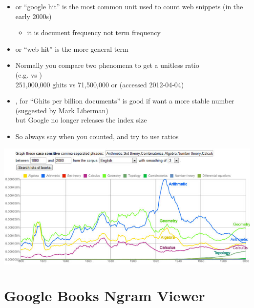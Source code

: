 \documentclass[a4paper,landscape,headrule,footrule,xetex]{foils}
\begin{document}
\begin{itemize}\addtolength{\itemsep}{-1ex}
\item {} or ``google hit'' is the most common unit used to
  count web snippets (in the early 2000s)
  \begin{itemize}
  \item it is document frequency not term frequency
  \end{itemize}
\item {} or ``web hit'' is the more general term
\item Normally you compare two phenomena to get a unitless ratio
  \\(e.g.  vs )
  \\ 251,000,000 ghits vs 71,500,000 or  (accessed 2012-04-04)
\item {}, for ``Ghits per billion documents'' is good if want a
  more stable number (suggested by Mark Liberman)
\\ but Google no longer releases the index size 
\item So always say when you counted, and try to use ratios
\end{itemize}


\begin{center}
  \includegraphics[width=\textwidth]{../pics/google_ngram_math_7}
\end{center}



\section{Google Books Ngram Viewer}
\end{document}
